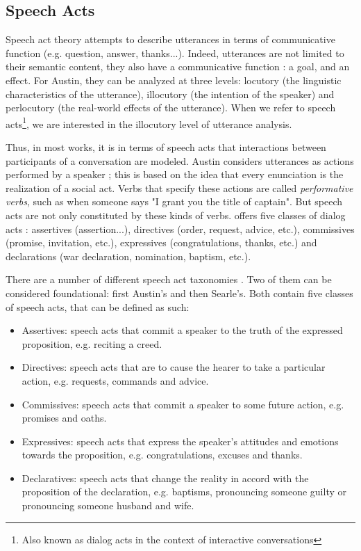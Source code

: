 \subsection{Speech Acts}

Speech act theory \cite{austin1975things} attempts to describe utterances in terms of communicative function (e.g. question, answer, thanks...). Indeed, utterances are not limited to their semantic content, they also have a communicative function : a goal, and an effect. For Austin, they can be analyzed at three levels: locutory (the linguistic characteristics of the utterance), illocutory (the intention of the speaker) and perlocutory (the real-world effects of the utterance). When we refer to speech acts\footnote{Also known as dialog acts in the context of interactive conversations}, we are interested in the illocutory level of utterance analysis. 

Thus, in most works, it is in terms of speech acts that interactions between participants of a conversation are modeled. Austin considers utterances as actions performed by a speaker ; this is based on the idea that every enunciation is the realization of a social act. Verbs that specify these actions are called \textit{performative verbs}, such as when someone says "I grant you the title of captain". But speech acts are not only constituted by these kinds of verbs. \cite{searle1976taxonomy} offers five classes of dialog acts : assertives (assertion...), directives (order, request, advice, etc.), commissives (promise, invitation, etc.), expressives (congratulations, thanks, etc.) and declarations (war declaration, nomination, baptism, etc.).

There are a number of different speech act taxonomies \cite{traum200020}. Two of them can be considered foundational: first Austin's and then Searle's. Both contain five classes of speech acts, that can be defined as such:


\begin{itemize}
	\item Assertives: speech acts that commit a speaker to the truth of the expressed proposition, e.g. reciting a creed.
	\item Directives: speech acts that are to cause the hearer to take a particular action, e.g. requests, commands and advice.
	\item Commissives: speech acts that commit a speaker to some future action, e.g. promises and oaths.
	\item Expressives: speech acts that express the speaker's attitudes and emotions towards the proposition, e.g. congratulations, excuses and thanks.
	\item Declaratives: speech acts that change the reality in accord with the proposition of the declaration, e.g. baptisms, pronouncing someone guilty or pronouncing someone husband and wife.
\end{itemize}

